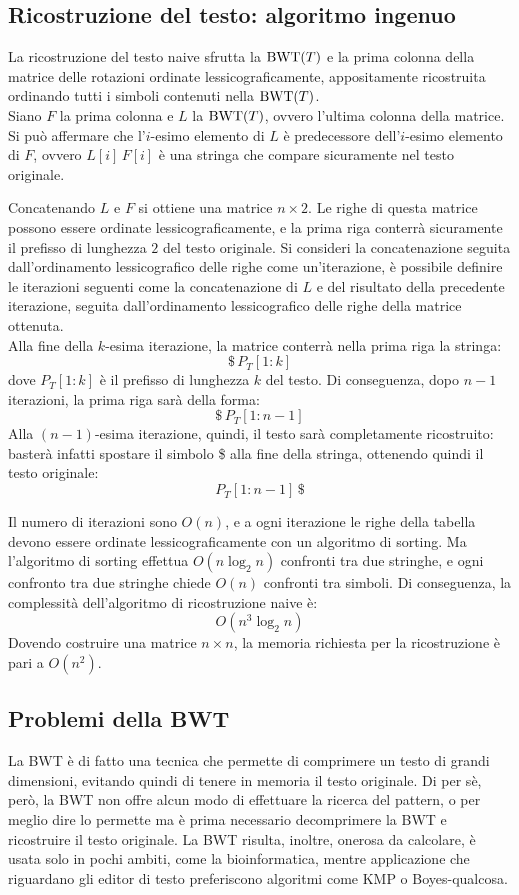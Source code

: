 \subsection*{Ricostruzione del testo: algoritmo ingenuo}
La ricostruzione del testo naive sfrutta la $\textnormal{BWT}(T)$ e la prima colonna della
matrice delle rotazioni ordinate lessicograficamente, appositamente ricostruita
ordinando tutti i simboli contenuti nella $\textnormal{BWT}(T)$.\\
Siano $F$ la prima colonna e $L$ la $\textnormal{BWT}(T)$, ovvero l'ultima colonna della
matrice. Si può affermare che l'$i$-esimo elemento di $L$ è predecessore
dell'$i$-esimo elemento di $F$, ovvero $L[i] \, F[i]$ è una stringa che compare
sicuramente nel testo originale.

Concatenando $L$ e $F$ si ottiene una matrice $n \times 2$. Le righe di questa
matrice possono essere ordinate lessicograficamente, e la prima riga conterrà
sicuramente il prefisso di lunghezza $2$ del testo originale.
Si consideri la concatenazione seguita dall'ordinamento lessicografico delle
righe come un'iterazione, è possibile definire le iterazioni seguenti come la
concatenazione di $L$ e del risultato della precedente iterazione, seguita
dall'ordinamento lessicografico delle righe della matrice ottenuta.\\
Alla fine della $k$-esima iterazione, la matrice conterrà nella prima riga la
stringa:
\[
    \$ \, P_T[1:k]
\]
dove $P_T[1:k]$ è il prefisso di lunghezza $k$ del testo. Di conseguenza, dopo
$n-1$ iterazioni, la prima riga sarà della forma:
\[
    \$ \, P_T[1:n-1]
\]
Alla $(n-1)$-esima iterazione, quindi, il testo sarà completamente ricostruito:
basterà infatti spostare il simbolo \$ alla fine della stringa, ottenendo quindi
il testo originale:
\[
    P_T[1:n-1] \, \$
\]

Il numero di iterazioni sono $O(n)$, e a ogni iterazione le righe della tabella
devono essere ordinate lessicograficamente con un algoritmo di sorting.
Ma l'algoritmo di sorting effettua $O(n \log_2n)$ confronti tra due stringhe,
e ogni confronto tra due stringhe chiede $O(n)$ confronti tra simboli.
Di conseguenza, la complessità dell'algoritmo di ricostruzione naive è:
\[
    O(n^3\log_2n)
\]
Dovendo costruire una matrice $n \times n$, la memoria richiesta per la
ricostruzione è pari a $O(n^2)$.

\subsection*{Problemi della BWT}
La BWT è di fatto una tecnica che permette di comprimere un testo di grandi
dimensioni, evitando quindi di tenere in memoria il testo originale.
Di per sè, però, la BWT non offre alcun modo di effettuare la ricerca
del pattern, o per meglio dire lo permette ma è prima necessario
decomprimere la BWT e ricostruire il testo originale.
La BWT risulta, inoltre, onerosa da calcolare, è usata solo in pochi ambiti,
come la bioinformatica, mentre applicazione che riguardano gli editor di
testo preferiscono algoritmi come KMP o Boyes-qualcosa.

